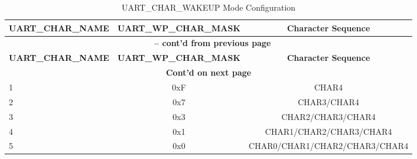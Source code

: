 \begin{longtable}[c]{|l|c|c|}
\caption{UART\_CHAR\_WAKEUP Mode Configuration}
\label{tab:uart-char-wakeup-cfg} \\
    \hline
    \rowcolor{lightgray}
    \textbf{UART\_CHAR\_NAME} & \textbf{UART\_WP\_CHAR\_MASK} & \textbf{Character Sequence} \\\hline
    \endfirsthead

    \multicolumn{3}{c}{\bfseries \tablename\ \thetable{} --  cont'd from previous page}\\\hline
    \rowcolor{lightgray}
    \textbf{UART\_CHAR\_NAME} & \textbf{UART\_WP\_CHAR\_MASK} & \textbf{Character Sequence} \\\hline
    \endhead

    \multicolumn{3}{c}{\textbf{Cont'd on next page}} \\
    \endfoot
    \endlastfoot

1 & 0xF & CHAR4 \\\hline
2 & 0x7 & CHAR3/CHAR4
 \\\hline
3 & 0x3 & CHAR2/CHAR3/CHAR4
 \\\hline
4 & 0x1 & CHAR1/CHAR2/CHAR3/CHAR4
 \\\hline
5 & 0x0 & CHAR0/CHAR1/CHAR2/CHAR3/CHAR4
 \\\hline
\end{longtable}
